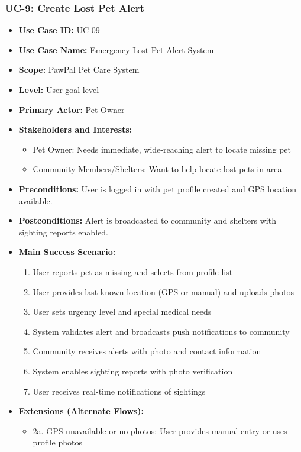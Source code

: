 \subsubsection*{UC-9: Create Lost Pet Alert}
\begin{itemize}
    \item \textbf{Use Case ID:} UC-09
    \item \textbf{Use Case Name:} Emergency Lost Pet Alert System
    \item \textbf{Scope:} PawPal Pet Care System
    \item \textbf{Level:} User-goal level
    \item \textbf{Primary Actor:} Pet Owner
    \item \textbf{Stakeholders and Interests:}
    \begin{itemize}
        \item Pet Owner: Needs immediate, wide-reaching alert to locate missing pet
        \item Community Members/Shelters: Want to help locate lost pets in area
    \end{itemize}
    \item \textbf{Preconditions:} User is logged in with pet profile created and GPS location available.
    \item \textbf{Postconditions:} Alert is broadcasted to community and shelters with sighting reports enabled.
    \item \textbf{Main Success Scenario:}
    \begin{enumerate}
        \item User reports pet as missing and selects from profile list
        \item User provides last known location (GPS or manual) and uploads photos
        \item User sets urgency level and special medical needs
        \item System validates alert and broadcasts push notifications to community
        \item Community receives alerts with photo and contact information
        \item System enables sighting reports with photo verification
        \item User receives real-time notifications of sightings
    \end{enumerate}
    \item \textbf{Extensions (Alternate Flows):}
    \begin{itemize}
        \item 2a. GPS unavailable or no photos: User provides manual entry or uses profile photos

\end{itemize}
\end{itemize}
